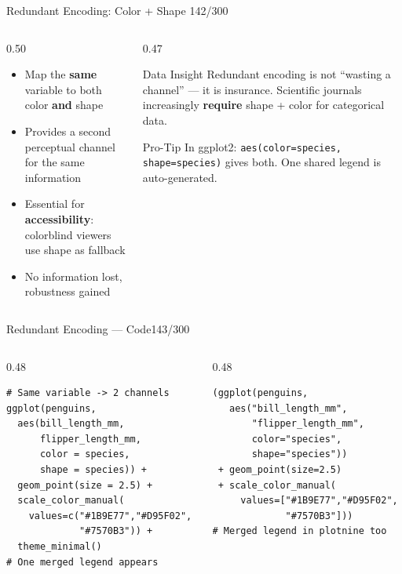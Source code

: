 \documentclass[10pt]{beamer}
\newcommand{\smark}[1]{\hfill{\scriptsize\color{codegray}#1}}
\begin{document}
\begin{frame}{Redundant Encoding: Color + Shape}
\smark{142/300}
\begin{columns}[T]
\begin{column}{0.50\textwidth}
\begin{itemize}
    \item Map the \textbf{same} variable to both color \textbf{and} shape
    \item Provides a second perceptual channel for the same information
    \item Essential for \textbf{accessibility}: colorblind viewers use shape as fallback
    \item No information lost, robustness gained
\end{itemize}
\end{column}
\begin{column}{0.47\textwidth}
\begin{exampleblock}{Data Insight}
    \scriptsize Redundant encoding is not ``wasting a channel'' --- it is insurance. Scientific journals increasingly \textbf{require} shape + color for categorical data.
\end{exampleblock}
\vspace{0.2cm}
\begin{alertblock}{Pro-Tip}
    \scriptsize In ggplot2: \texttt{aes(color=species, shape=species)} gives both. One shared legend is auto-generated.
\end{alertblock}
\end{column}
\end{columns}
\end{frame}

\begin{frame}[fragile]{Redundant Encoding --- Code}\smark{143/300}
\begin{columns}[T]
\begin{column}{0.48\textwidth}
\begin{lstlisting}[style=Rstyle]
# Same variable -> 2 channels
ggplot(penguins,
  aes(bill_length_mm,
      flipper_length_mm,
      color = species,
      shape = species)) +
  geom_point(size = 2.5) +
  scale_color_manual(
    values=c("#1B9E77","#D95F02",
             "#7570B3")) +
  theme_minimal()
# One merged legend appears
\end{lstlisting}
\end{column}
\begin{column}{0.48\textwidth}
\begin{lstlisting}[style=Pystyle]
(ggplot(penguins,
   aes("bill_length_mm",
       "flipper_length_mm",
       color="species",
       shape="species"))
 + geom_point(size=2.5)
 + scale_color_manual(
     values=["#1B9E77","#D95F02",
             "#7570B3"]))
# Merged legend in plotnine too
\end{lstlisting}
\end{column}
\end{columns}
\end{frame}
\end{document}
